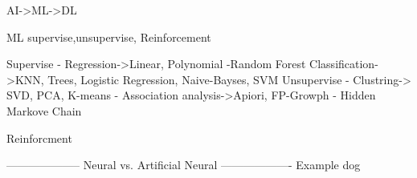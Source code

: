\documentclass{article}
\begin{document}
AI->ML->DL

ML supervise,unsupervise, Reinforcement

Supervise
- Regression->Linear, Polynomial
-Random Forest
Classification->KNN, Trees, Logistic Regression, Naive-Bayses, SVM
Unsupervise
- Clustring-> SVD, PCA, K-means
- Association analysis->Apiori, FP-Growph
- Hidden Markove Chain

Reinforcment


--------------------
Neural vs. Artificial Neural
-------------------
Example dog
\end{document}
